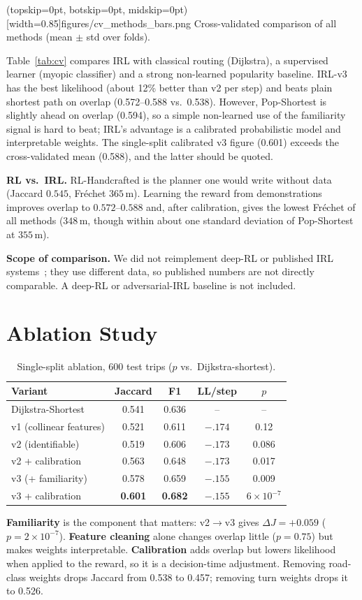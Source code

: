\documentclass{ieeeaccess}
\begin{document}
\Figure[t!](topskip=0pt, botskip=0pt, midskip=0pt)[width=0.85\textwidth]{figures/cv_methods_bars.png}
{Cross-validated comparison of all methods (mean $\pm$ std over folds).\label{fig:cv}}

Table~\ref{tab:cv} compares IRL with classical routing (Dijkstra), a supervised learner (myopic classifier) and a strong non-learned popularity baseline. IRL-v3 has the best likelihood (about 12\% better than v2 per step) and beats plain shortest path on overlap (0.572--0.588 vs.\ 0.538). However, Pop-Shortest is slightly ahead on overlap (0.594), so a simple non-learned use of the familiarity signal is hard to beat; IRL's advantage is a calibrated probabilistic model and interpretable weights. The single-split calibrated v3 figure (0.601) exceeds the cross-validated mean (0.588), and the latter should be quoted.

\textbf{RL vs.\ IRL.} RL-Handcrafted is the planner one would write without data (Jaccard $0.545$, Fr\'echet $365$\,m). Learning the reward from demonstrations improves overlap to $0.572$--$0.588$ and, after calibration, gives the lowest Fr\'echet of all methods ($348$\,m, though within about one standard deviation of Pop-Shortest at $355$\,m).

\textbf{Scope of comparison.} We did not reimplement deep-RL or published IRL systems~\cite{zhao2023,barnes2024,liu2020}; they use different data, so published numbers are not directly comparable. A deep-RL or adversarial-IRL baseline is not included.

\section{Ablation Study}\label{sec:ablation}
\begin{table}[t]
\centering\footnotesize
\caption{Single-split ablation, 600 test trips ($p$ vs.\ Dijkstra-shortest).}\label{tab:abl}
\begin{tabular}{@{}lcccc@{}}
\toprule
Variant & Jaccard & F1 & LL/step & $p$\\
\midrule
Dijkstra-Shortest & 0.541 & 0.636 & -- & --\\
v1 (collinear features) & 0.521 & 0.611 & $-.174$ & 0.12\\
v2 (identifiable) & 0.519 & 0.606 & $-.173$ & 0.086\\
v2 + calibration & 0.563 & 0.648 & $-.173$ & 0.017\\
v3 (+ familiarity) & 0.578 & 0.659 & $-.155$ & 0.009\\
v3 + calibration & \textbf{0.601} & \textbf{0.682} & $-.155$ & $6{\times}10^{-7}$\\
\bottomrule
\end{tabular}
\end{table}
\textbf{Familiarity} is the component that matters: v2$\to$v3 gives $\Delta J=+0.059$ ($p=2\times10^{-7}$). \textbf{Feature cleaning} alone changes overlap little ($p=0.75$) but makes weights interpretable. \textbf{Calibration} adds overlap but lowers likelihood when applied to the reward, so it is a decision-time adjustment. Removing road-class weights drops Jaccard from 0.538 to 0.457; removing turn weights drops it to 0.526.
\end{document}
